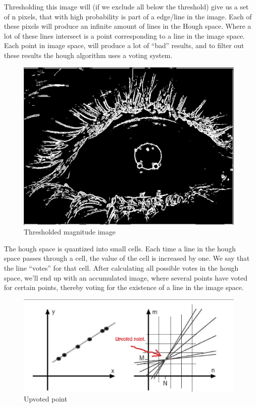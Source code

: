 Thresholding this image will (if we exclude all below the threshold)
give us a set of n pixels, that with high probability is part of a
edge/line in the image. Each of these pixels will produce an infinite
amount of lines in the Hough space. Where a lot of these lines intersect
is a point corresponding to a line in the image space. Each point in
image space, will produce a lot of ``bad'' results, and to filter out
these results the hough algorithm uses a voting system.

\begin{figure}[htbp]
\centering
\includegraphics{pics/hough/4.png}
\caption{Thresholded magnitude image \label{hough4}}
\end{figure}

The hough space is quantized into small cells. Each time a line in the
hough space passes through a cell, the value of the cell is increased by
one. We say that the line ``votes'' for that cell. After calculating all
possible votes in the hough space, we'll end up with an accumulated
image, where several points have voted for certain points, thereby
voting for the existence of a line in the image space.

\begin{figure}[htbp]
\centering
\includegraphics{pics/hough/5.png}
\caption{Upvoted point \label{hough5}}
\end{figure}

